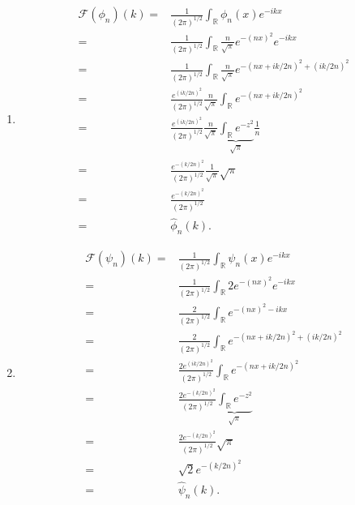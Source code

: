 \documentclass{article}
\begin{document}
\begin{enumerate}
\begin{enumerate}
					\item
						$$
						\begin{aligned}
						\mathcal{F}(\phi_{n})(k) = & \frac{1}{(2\pi)^{1/2}}\int_{\mathbb{R}} \phi_{n}(x)e^{-ikx}
						\\
						 = & \frac{1}{(2\pi)^{1/2}}\int_{\mathbb{R}} \frac{n}{\sqrt{\pi}}e^{-(nx)^{2}} e^{-ikx}
						 \\
						 = & \frac{1}{(2\pi)^{1/2}}\int_{\mathbb{R}} \frac{n}{\sqrt{\pi}}e^{-(nx + ik/2n)^{2} + (ik/2n)^{2}}
						 \\
						 = & \frac{e^{(ik/2n)^{2}}}{(2\pi)^{1/2}} \frac{n}{\sqrt{\pi}} \int_{\mathbb{R}} e^{-(nx + ik/2n)^{2}}
						 \\
						 = & \frac{e^{(ik/2n)^{2}}}{(2\pi)^{1/2}} \frac{n}{\sqrt{\pi}} \underbrace{ \int_{\mathbb{R}} e^{-z^{2}} }_{\sqrt{\pi}} \frac{1}{n}
						 \\
						 = & \frac{e^{-(k/2n)^{2}}}{(2\pi)^{1/2}} \frac{1}{\sqrt{\pi}} \sqrt{\pi}
						 \\
						 = & \frac{e^{-(k/2n)^{2}}}{(2\pi)^{1/2}}
						 \\
						 = & \hat{\phi}_{n}(k).
						\end{aligned}
						$$
					\item 
					$$
					\begin{aligned}
					\mathcal{F}(\psi_{n})(k) = & \frac{1}{(2\pi)^{1/2}}\int_{\mathbb{R}} \psi_{n}(x)e^{-ikx}
					\\
					= & \frac{1}{(2\pi)^{1/2}}\int_{\mathbb{R}}  2 e^{-(nx)^{2}}e^{-ikx}
					\\
					= & \frac{2}{(2\pi)^{1/2}}\int_{\mathbb{R}} e^{-(nx)^{2} -ikx }
					\\
					= & \frac{2}{(2\pi)^{1/2}}\int_{\mathbb{R}} e^{-(nx + ik/2n)^{2} + (ik/2n)^{2}}
					\\
					= & \frac{2e^{(ik/2n)^{2}} }{(2\pi)^{1/2}}\int_{\mathbb{R}} e^{-(nx + ik/2n)^{2} }
					\\
					= & \frac{2e^{-(k/2n)^{2}} }{(2\pi)^{1/2}} \underbrace{ \int_{\mathbb{R}} e^{-z^{2} } }_{\sqrt{\pi}}
					\\
					= & \frac{2 e^{-(k/2n)^{2}} }{(2\pi)^{1/2}} \sqrt{\pi}
					\\
					= & \sqrt{2} e^{-(k/2n)^{2}}
					\\
					= & \hat{\psi}_{n}(k). 
					\end{aligned}
					$$
			\end{enumerate}
	\end{enumerate}
	
	
\end{document}
